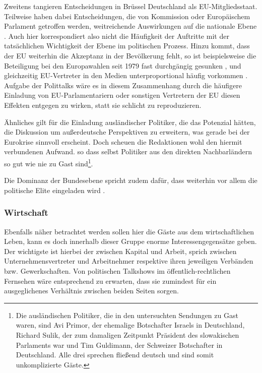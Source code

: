 Zweitens tangieren Entscheidungen in Brüssel Deutschland als EU-Mitgliedsstaat. Teilweise haben dabei Entscheidungen, die von Kommission oder Europäischem Parlament getroffen werden, weitreichende Auswirkungen auf die nationale Ebene \parencite{sturmNeueDeutscheRegierungssystem2005}. Auch hier korrespondiert also nicht die Häufigkeit der Auftritte mit der tatsächlichen Wichtigkeit der Ebene im politischen Prozess. Hinzu kommt, dass der EU weiterhin die Akzeptanz in der Bevölkerung fehlt, so ist beispielsweise die Beteiligung bei den Europawahlen seit 1979 fast durchgängig gesunken \parencite{bundeszentralefuerpolitischebildungEuropawahlWahlbeteiligung197920092009}, und gleichzeitig EU-Vertreter in den Medien unterproportional häufig vorkommen \parencite{roschMedienHabenNachholbedarf2008}. Aufgabe der Polittalks wäre es in diesem Zusammenhang durch die häufigere Einladung von EU-Parlamentariern oder sonstigen Vertretern der EU diesen Effekten entgegen zu wirken, statt sie schlicht zu reproduzieren.

Ähnliches gilt für die Einladung ausländischer Politiker, die das Potenzial hätten, die Diskussion um außerdeutsche Perspektiven zu erweitern, was gerade bei der Eurokrise  sinnvoll erscheint. Doch scheuen die Redaktionen wohl den hiermit verbundenen Aufwand. so dass selbst Politiker aus den direkten Nachbarländern so gut wie nie zu Gast sind\footnote{Die ausländischen Politiker, die in den untersuchten Sendungen zu Gast waren, sind Avi Primor, der ehemalige Botschafter Israels in Deutschland, Richard Sulik, der zum damaligen Zeitpunkt Präsident des slowakischen Parlaments war und Tim Guldimann, der Schweizer Botschafter in Deutschland. Alle drei sprechen fließend deutsch und sind somit unkomplizierte Gäste.}.

Die Dominanz der Bundesebene spricht zudem dafür, dass weiterhin vor allem die politische Elite eingeladen wird \parencite[141]{doernerPolitainmentPolitikMedialen2001}.

\subsubsection{Wirtschaft}

Ebenfalls näher betrachtet werden sollen hier die Gäste aus dem wirtschaftlichen Leben, kann es doch innerhalb dieser Gruppe enorme Interessengegensätze geben. Der wichtigste ist hierbei der zwischen Kapital und Arbeit, sprich zwischen Unternehmensvertreter und Arbeitnehmer respektive ihren jeweiligen Verbänden bzw. Gewerkschaften. Von politischen Talkshows im öffentlich-rechtlichen Fernsehen wäre entsprechend zu erwarten, dass sie zumindest für ein ausgeglichenes Verhältnis zwischen beiden Seiten sorgen.

